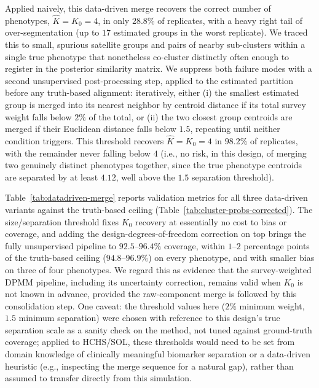 \documentclass[11pt]{article}
\begin{document}
Applied naively, this data-driven merge recovers the correct number of phenotypes, $\hat K=K_0=4$, in only $28.8\%$ of replicates, with a heavy right tail of over-segmentation (up to $17$ estimated groups in the worst replicate). We traced this to small, spurious satellite groups and pairs of nearby sub-clusters within a single true phenotype that nonetheless co-cluster distinctly often enough to register in the posterior similarity matrix. We suppress both failure modes with a second unsupervised post-processing step, applied to the estimated partition before any truth-based alignment: iteratively, either (i) the smallest estimated group is merged into its nearest neighbor by centroid distance if its total survey weight falls below $2\%$ of the total, or (ii) the two closest group centroids are merged if their Euclidean distance falls below $1.5$, repeating until neither condition triggers. This threshold recovers $\hat K = K_0 = 4$ in $98.2\%$ of replicates, with the remainder never falling below $4$ (i.e., no risk, in this design, of merging two genuinely distinct phenotypes together, since the true phenotype centroids are separated by at least $4.12$, well above the $1.5$ separation threshold).

Table~\ref{tab:datadriven-merge} reports validation metrics for all three data-driven variants against the truth-based ceiling (Table~\ref{tab:cluster-probs-corrected}). The size/separation threshold fixes $K_0$ recovery at essentially no cost to bias or coverage, and adding the design-degrees-of-freedom correction on top brings the fully unsupervised pipeline to $92.5$--$96.4\%$ coverage, within $1$--$2$ percentage points of the truth-based ceiling ($94.8$--$96.9\%$) on every phenotype, and with smaller bias on three of four phenotypes. We regard this as evidence that the survey-weighted DPMM pipeline, including its uncertainty correction, remains valid when $K_0$ is not known in advance, provided the raw-component merge is followed by this consolidation step. One caveat: the threshold values here ($2\%$ minimum weight, $1.5$ minimum separation) were chosen with reference to this design's true separation scale as a sanity check on the method, not tuned against ground-truth coverage; applied to HCHS/SOL, these thresholds would need to be set from domain knowledge of clinically meaningful biomarker separation or a data-driven heuristic (e.g., inspecting the merge sequence for a natural gap), rather than assumed to transfer directly from this simulation.
\end{document}

